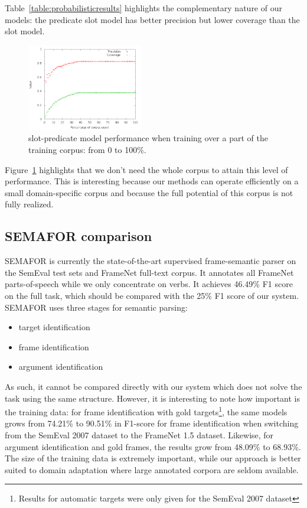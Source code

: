 Table~\ref{table:probabilisticresults} highlights the complementary nature of
our models: the predicate slot model has better precision but lower coverage
than the slot model.

\begin{figure}[t]
    \centering
    \includegraphics[width=0.45\textwidth]{fig/slot-predicate-percents.png}
    \caption{\label{fig:slot_predicate} slot-predicate model performance when training over a part of the training corpus: from 0 to 100\%.}
\end{figure}

Figure~\ref{fig:slot_predicate} highlights that we don't need the whole corpus
to attain this level of performance. This is interesting because our methods
can operate efficiently on a small domain-specific corpus and because the full
potential of this corpus is not fully realized.

\subsection{SEMAFOR comparison}

SEMAFOR \citep{das2014frame} is currently the state-of-the-art supervised
frame-semantic parser on the SemEval test sets and FrameNet full-text corpus.
It annotates all FrameNet parts-of-speech while we only concentrate on verbs.
It achieves 46.49\% F1 score on the full task, which should be compared with
the 25\% F1 score of our system.  SEMAFOR uses three stages for semantic
parsing:

\begin{itemize}
    \item target identification
    \item frame identification
    \item argument identification
\end{itemize}

As such, it cannot be compared directly with our system which does not solve
the task using the same structure. However, it is interesting to note how
important is the training data: for frame identification with gold
targets\footnote{Results for automatic targets were only given for the SemEval
2007 dataset}, the same models grows from 74.21\% to 90.51\% in F1-score for
frame identification when switching from the SemEval 2007 dataset to the
FrameNet 1.5 dataset. Likewise, for argument identification and gold
frames\footnotemark[\value{footnote}], the results grow from 48.09\% to
68.93\%. The size of the training data is extremely important, while our
approach is better suited to domain adaptation where large annotated corpora
are seldom available.

